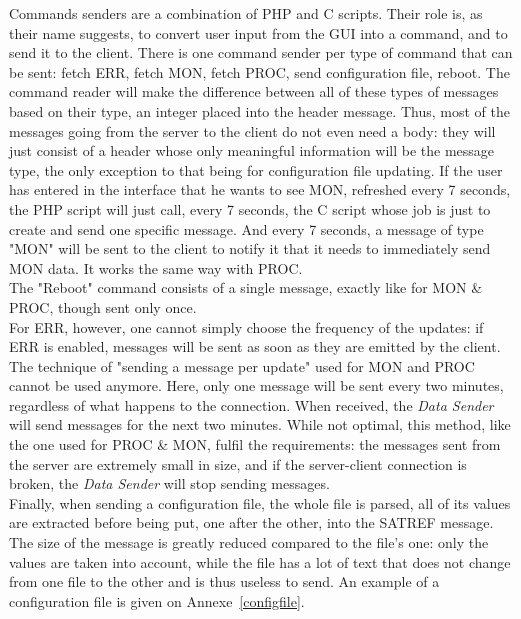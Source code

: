 \documentclass{themeensg}
\begin{document}
Commands senders are a combination of PHP and C scripts. Their role is, as their name suggests, to convert user input from the GUI into a command, and to send it to the client. There is one command sender per type of command that can be sent: fetch ERR, fetch MON, fetch PROC, send configuration file, reboot. The command reader will make the difference between all of these types of messages based on their type, an integer placed into the header message. Thus, most of the messages going from the server to the client do not even need a body: they will just consist of a header whose only meaningful information will be the message type, the only exception to that being for configuration file updating.
If the user has entered in the interface that he wants to see MON, refreshed every 7 seconds, the PHP script will just call, every 7 seconds, the C script whose job is just to create and send one specific message. And every 7 seconds, a message of type "MON" will be sent to the client to notify it that it needs to immediately send MON data. It works the same way with PROC.\\

The "Reboot" command consists of a single message, exactly like for MON \& PROC, though sent only once. \\

For ERR, however, one cannot simply choose the frequency of the updates: if ERR is enabled, messages will be sent as soon as they are emitted by the client. The technique of "sending a message per update" used for MON and PROC cannot be used anymore. Here, only one message will be sent every two minutes, regardless of what happens to the connection. When received, the \textit{Data Sender} will send messages for the next two minutes. While not optimal, this method, like the one used for PROC \& MON, fulfil the requirements: the messages sent from the server are extremely small in size, and if the server-client connection is broken, the \textit{Data Sender} will stop sending messages.\\

Finally, when sending a configuration file, the whole file is parsed, all of its values are extracted before being put, one after the other, into the SATREF message. The size of the message is greatly reduced compared to the file's one: only the values are taken into account, while the file has a lot of text that does not change from one file to the other and is thus useless to send. An example of a configuration file is given on Annexe~\ref{configfile}.\\
\end{document}
